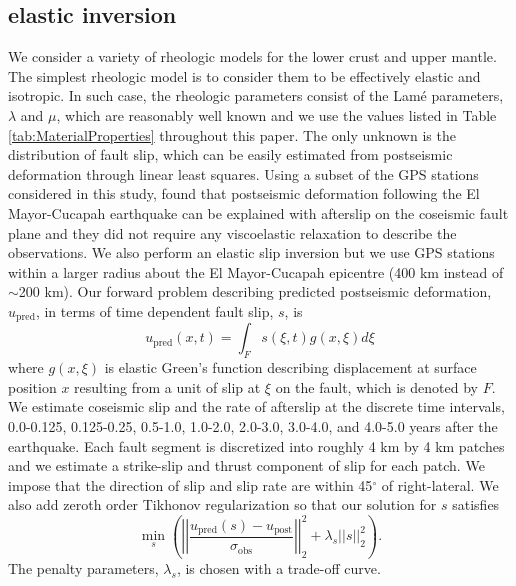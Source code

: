 \documentclass[1p]{elsarticle}
\begin{document}
\subsection{elastic inversion}\label{sec:ElasticInversion}    
We consider a variety of rheologic models for the lower crust and upper mantle. The simplest rheologic model is to consider them to be effectively elastic and isotropic.  In such case, the rheologic parameters consist of the Lam\'e parameters, $\lambda$ and $\mu$, which are reasonably well known and we use the values listed in Table \ref{tab:MaterialProperties} throughout this paper.  The only unknown is the distribution of fault slip, which can be easily estimated from postseismic deformation through linear least squares.  Using a subset of the GPS stations considered in this study, \citet{Rollins2015} found that postseismic deformation following the El Mayor-Cucapah earthquake can be explained with afterslip on the coseismic fault plane and they did not require any viscoelastic relaxation to describe the observations. We also perform an elastic slip inversion but we use GPS stations within a larger radius about the El Mayor-Cucapah epicentre (400 km instead of $\sim$200 km). Our forward problem describing predicted postseismic deformation, $u_\mathrm{pred}$, in terms of time dependent fault slip, $s$, is
\begin{equation}\label{eq:ElasticForward}
  u_\mathrm{pred}(x,t) = \int_F s(\xi,t)g(x,\xi)d\xi 
\end{equation}           
where $g(x,\xi)$ is elastic Green's function describing displacement at surface position $x$ resulting from a unit of slip at $\xi$ on the fault, which is denoted by $F$.  We estimate coseismic slip and the rate of afterslip at the discrete time intervals, 0.0-0.125, 0.125-0.25, 0.5-1.0, 1.0-2.0, 2.0-3.0, 3.0-4.0, and 4.0-5.0 years after the earthquake.  Each fault segment is discretized into roughly 4 km by 4 km patches and we estimate a strike-slip and thrust component of slip for each patch. We impose that the direction of slip and slip rate are within 45$^\circ$ of right-lateral. We also add zeroth order Tikhonov regularization so that our solution for $s$ satisfies
\begin{equation}\label{eq:ElasticObjective}
  \min_s \left(\left|\left|\frac{u_\mathrm{pred}(s) - u_\mathrm{post}}                
                                {\sigma_\mathrm{obs}}\right|\right|_2^2 + 
                                \lambda_s||s||_2^2\right). 
\end{equation}
The penalty parameters, $\lambda_s$, is chosen with a trade-off curve. 
\end{document}
